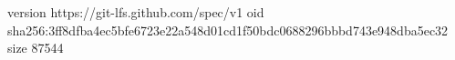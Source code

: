 version https://git-lfs.github.com/spec/v1
oid sha256:3ff8dfba4ec5bfe6723e22a548d01cd1f50bdc0688296bbbd743e948dba5ec32
size 87544
